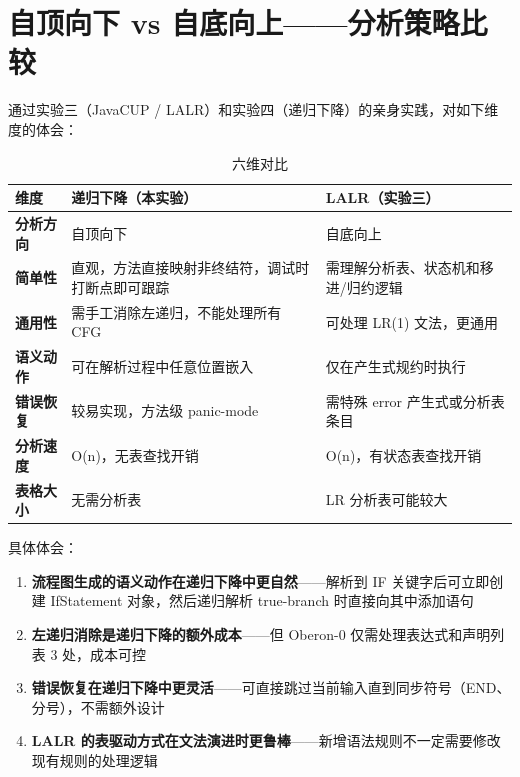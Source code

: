 \documentclass[12pt,a4paper,fontset=none]{ctexart}
\begin{document}
\section{自顶向下 vs 自底向上——分析策略比较}

通过实验三（JavaCUP / LALR）和实验四（递归下降）的亲身实践，对如下维度的体会：

\begin{table}[H]\centering
\begin{tabularx}{\textwidth}{>{\bfseries}P{2.8cm}YY}
\toprule
维度 & 递归下降（本实验） & LALR（实验三） \\
\midrule
分析方向 & 自顶向下 & 自底向上 \\
简单性 & 直观，方法直接映射非终结符，调试时打断点即可跟踪 & 需理解分析表、状态机和移进/归约逻辑 \\
通用性 & 需手工消除左递归，不能处理所有 CFG & 可处理 LR(1) 文法，更通用 \\
语义动作 & 可在解析过程中任意位置嵌入 & 仅在产生式规约时执行 \\
错误恢复 & 较易实现，方法级 panic-mode & 需特殊 error 产生式或分析表条目 \\
分析速度 & O(n)，无表查找开销 & O(n)，有状态表查找开销 \\
表格大小 & 无需分析表 & LR 分析表可能较大 \\
\bottomrule
\end{tabularx}
\caption{六维对比}
\end{table}

具体体会：
\begin{enumerate}
  \item \textbf{流程图生成的语义动作在递归下降中更自然}——解析到 IF 关键字后可立即创建 IfStatement 对象，然后递归解析 true-branch 时直接向其中添加语句
  \item \textbf{左递归消除是递归下降的额外成本}——但 Oberon-0 仅需处理表达式和声明列表 3 处，成本可控
  \item \textbf{错误恢复在递归下降中更灵活}——可直接跳过当前输入直到同步符号（END、分号），不需额外设计
  \item \textbf{LALR 的表驱动方式在文法演进时更鲁棒}——新增语法规则不一定需要修改现有规则的处理逻辑
\end{enumerate}
\end{document}
